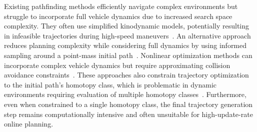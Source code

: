 

Existing pathfinding methods efficiently navigate complex environments but struggle to incorporate full vehicle dynamics due to increased search space complexity. 
They often use simplified kinodynamic models, potentially resulting in infeasible trajectories during high-speed maneuvers~\cite{pivtoraiko2005efficient, liu2017search}. 
An alternative approach reduces planning complexity while considering full dynamics by using informed sampling around a point-mass initial path~\cite{penicka2022minimum}.
Nonlinear optimization methods can incorporate complex vehicle dynamics but require approximating collision avoidance constraints~\cite{liu2017planning, marcucci2024shortest, shao2023design, wang2023speed}. 
These approaches also constrain trajectory optimization to the initial path's homotopy class, which is problematic in dynamic environments requiring evaluation of multiple homotopy classes~\cite{beyer2024riskpredictive, schmittle2024multi, zhou2021raptor}. 
Furthermore, even when constrained to a single homotopy class, the final trajectory generation step remains computationally intensive and often unsuitable for high-update-rate online planning.

